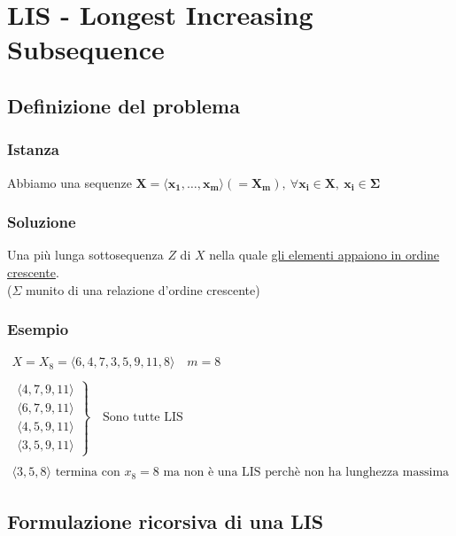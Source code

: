 \chapter{LIS - Longest Increasing Subsequence}

\section{Definizione del problema}

\subsection{Istanza}
Abbiamo una sequenze $\mathbf{X = \langle x_1, \dots, x_m \rangle (= X_m),\ \forall x_i \in X,\ x_i \in \Sigma}$

\subsection{Soluzione}
Una più lunga sottosequenza $Z$ di $X$ nella quale \uline{gli elementi appaiono in ordine crescente}.\\
($\Sigma$ munito di una relazione d'ordine crescente)

\subsection{Esempio}
{
    \large
    \begin{gather*}
        X = X_8 = \langle 6,4,7,3,5,9,11,8 \rangle \quad m=8 \\ \\ 
        \left.
        \begin{aligned}
        \langle 4, 7, 9, 11 \rangle \\
        \langle 6, 7, 9, 11 \rangle \\
        \langle 4, 5, 9, 11 \rangle \\
        \langle 3, 5, 9, 11 \rangle
        \end{aligned}
        \right\}
        \quad \text{Sono tutte LIS} \\ \\
        \langle 3,5,8\rangle  \text{ termina con $x_8 = 8$ ma non è una LIS perchè non ha lunghezza massima}
    \end{gather*}
}

\newpage
\section{Formulazione ricorsiva di una LIS}
